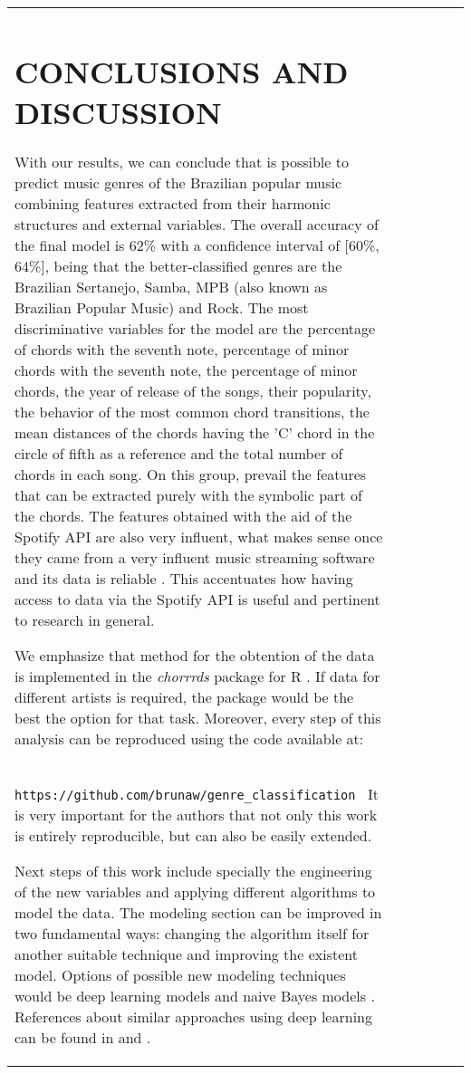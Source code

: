 \documentclass[twocolumn]{article}
\begin{document}
\begin{table}[ht]
\begin{tabular}{llllll}
\section{CONCLUSIONS AND DISCUSSION}

With our results, we can conclude that is possible
to predict music genres of the Brazilian popular music
combining features extracted from their harmonic structures
and external variables.  The overall accuracy of the final 
model is 62\% with a confidence interval of [60\%, 64\%],
being that the better-classified genres are the Brazilian
Sertanejo, Samba, MPB (also known as Brazilian Popular Music) 
and Rock. The most discriminative variables for the model 
are the percentage of chords with the seventh note, 
percentage of minor chords with the seventh note, the percentage 
of  minor chords, the year of release of the songs, their
popularity, the behavior of the most common chord transitions,
the mean distances of the chords having the 'C' chord in
the circle of fifth as a reference and the total number of
chords in each song. On this group, prevail the 
features that can be extracted purely with the symbolic
part of the chords. The features obtained with the aid of
the Spotify API are also very influent, what makes sense 
once they came from a very influent music streaming software
and its data is reliable \cite{Schettino2017}. This 
accentuates how having access to data via the Spotify API is 
useful and pertinent to research in general. 

We emphasize that method for the obtention of 
the data is implemented in the \textit{chorrrds} 
package for R \cite{chorrrds}. If data for different artists
is required, the package would be the best the option
for that task. Moreover, every step of this analysis can be 
reproduced using the code available at: \\
\small\texttt{https://github.com/brunaw/genre\_classification }
It is very important for the authors that not only 
this work is entirely reproducible, but can also
be easily extended.

Next steps of this work include specially
the engineering of the new variables and 
applying different algorithms to model the data.
The modeling section can be improved in two
fundamental ways: changing the algorithm itself for
another suitable technique and improving the existent model. Options of possible new modeling techniques would be deep learning models \cite{Lecun2015} and
naive Bayes models \cite{Murphy2006}. 
References about similar approaches 
using deep learning can be found in \cite{cnnmusicgenre} and 
\cite{cnnmusicgenre2}. 


\end{tabular}
\end{table}
\end{document}
